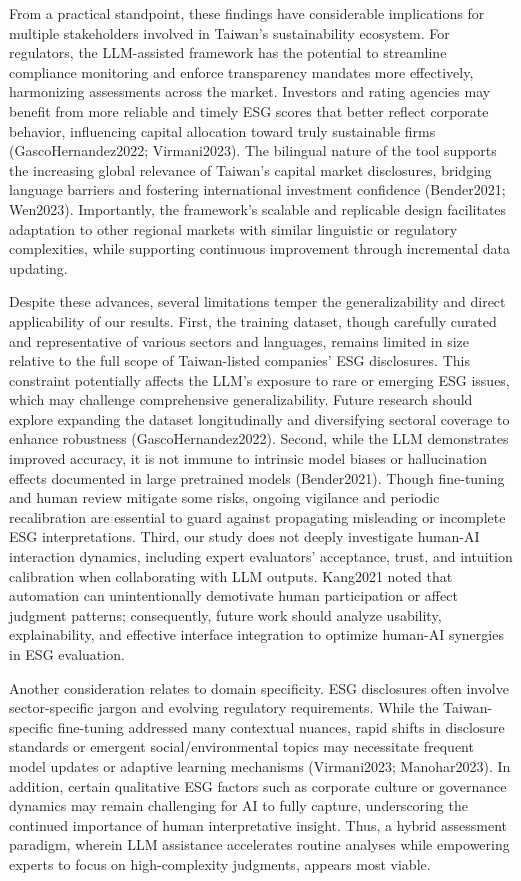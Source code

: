 \documentclass[
  12pt,
]{article}
\begin{document}
From a practical standpoint, these findings have considerable
implications for multiple stakeholders involved in Taiwan's
sustainability ecosystem. For regulators, the LLM-assisted framework has
the potential to streamline compliance monitoring and enforce
transparency mandates more effectively, harmonizing assessments across
the market. Investors and rating agencies may benefit from more reliable
and timely ESG scores that better reflect corporate behavior,
influencing capital allocation toward truly sustainable firms
(GascoHernandez2022; Virmani2023). The bilingual nature of the tool
supports the increasing global relevance of Taiwan's capital market
disclosures, bridging language barriers and fostering international
investment confidence (Bender2021; Wen2023). Importantly, the
framework's scalable and replicable design facilitates adaptation to
other regional markets with similar linguistic or regulatory
complexities, while supporting continuous improvement through
incremental data updating.

Despite these advances, several limitations temper the generalizability
and direct applicability of our results. First, the training dataset,
though carefully curated and representative of various sectors and
languages, remains limited in size relative to the full scope of
Taiwan-listed companies' ESG disclosures. This constraint potentially
affects the LLM's exposure to rare or emerging ESG issues, which may
challenge comprehensive generalizability. Future research should explore
expanding the dataset longitudinally and diversifying sectoral coverage
to enhance robustness (GascoHernandez2022). Second, while the LLM
demonstrates improved accuracy, it is not immune to intrinsic model
biases or hallucination effects documented in large pretrained models
(Bender2021). Though fine-tuning and human review mitigate some risks,
ongoing vigilance and periodic recalibration are essential to guard
against propagating misleading or incomplete ESG interpretations. Third,
our study does not deeply investigate human-AI interaction dynamics,
including expert evaluators' acceptance, trust, and intuition
calibration when collaborating with LLM outputs. Kang2021 noted that
automation can unintentionally demotivate human participation or affect
judgment patterns; consequently, future work should analyze usability,
explainability, and effective interface integration to optimize human-AI
synergies in ESG evaluation.

Another consideration relates to domain specificity. ESG disclosures
often involve sector-specific jargon and evolving regulatory
requirements. While the Taiwan-specific fine-tuning addressed many
contextual nuances, rapid shifts in disclosure standards or emergent
social/environmental topics may necessitate frequent model updates or
adaptive learning mechanisms (Virmani2023; Manohar2023). In addition,
certain qualitative ESG factors such as corporate culture or governance
dynamics may remain challenging for AI to fully capture, underscoring
the continued importance of human interpretative insight. Thus, a hybrid
assessment paradigm, wherein LLM assistance accelerates routine analyses
while empowering experts to focus on high-complexity judgments, appears
most viable.
\end{document}

